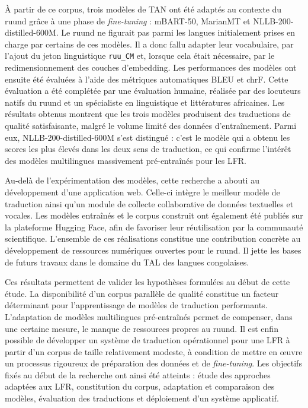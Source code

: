 À partir de ce corpus, trois modèles de \ac{TAN} ont été adaptés au contexte du ruund grâce à une phase de \textit{fine-tuning} : \ac{mBART}-50, \ac{MarianMT} et \ac{NLLB}-200-distilled-600M. Le ruund ne figurait pas parmi les langues initialement prises en charge par certains de ces modèles. Il a donc fallu adapter leur vocabulaire, par l'ajout du jeton linguistique \texttt{ruu\_CM} et, lorsque cela était nécessaire, par le redimensionnement des couches d'embedding. Les performances des modèles ont ensuite été évaluées à l'aide des métriques automatiques \ac{BLEU} et \ac{chrF}. Cette évaluation a été complétée par une évaluation humaine, réalisée par des locuteurs natifs du ruund et un spécialiste en linguistique et littératures africaines. Les résultats obtenus montrent que les trois modèles produisent des traductions de qualité satisfaisante, malgré le volume limité des données d'entraînement. Parmi eux, \ac{NLLB}-200-distilled-600M s'est distingué : c'est le modèle qui a obtenu les scores les plus élevés dans les deux sens de traduction, ce qui confirme l'intérêt des modèles multilingues massivement pré-entraînés pour les \ac{LFR}.

Au-delà de l'expérimentation des modèles, cette recherche a abouti au développement d'une application web. Celle-ci intègre le meilleur modèle de traduction ainsi qu'un module de collecte collaborative de données textuelles et vocales. Les modèles entraînés et le corpus construit ont également été publiés sur la plateforme Hugging Face, afin de favoriser leur réutilisation par la communauté scientifique. L'ensemble de ces réalisations constitue une contribution concrète au développement de ressources numériques ouvertes pour le ruund. Il jette les bases de futurs travaux dans le domaine du \ac{TAL} des langues congolaises.

Ces résultats permettent de valider les hypothèses formulées au début de cette étude. La disponibilité d'un corpus parallèle de qualité constitue un facteur déterminant pour l'apprentissage de modèles de traduction performants. L'adaptation de modèles multilingues pré-entraînés permet de compenser, dans une certaine mesure, le manque de ressources propres au ruund. Il est enfin possible de développer un système de traduction opérationnel pour une \ac{LFR} à partir d'un corpus de taille relativement modeste, à condition de mettre en œuvre un processus rigoureux de préparation des données et de \textit{fine-tuning}. Les objectifs fixés au début de la recherche ont ainsi été atteints : étude des approches adaptées aux \ac{LFR}, constitution du corpus, adaptation et comparaison des modèles, évaluation des traductions et déploiement d'un système applicatif.

